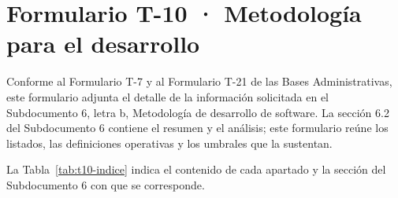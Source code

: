 \documentclass[11pt]{article}
\begin{document}
\hypersetup{pageanchor=false}
\hypersetup{pageanchor=true}
\tableofcontents
\clearpage

\renewcommand{\tablename}{Tabla}
\renewcommand{\thetable}{T-10.\arabic{table}}

\section{Formulario T-10 · Metodología para el desarrollo}\label{formulario-t-10}

Conforme al Formulario T-7 y al Formulario T-21 de las Bases Administrativas, este formulario adjunta el detalle de la información solicitada en el Subdocumento 6, letra b, Metodología de desarrollo de software. La sección 6.2 del Subdocumento 6 contiene el resumen y el análisis; este formulario reúne los listados, las definiciones operativas y los umbrales que la sustentan.

La Tabla~\mbox{\ref{tab:t10-indice}} indica el contenido de cada apartado y la sección del Subdocumento 6 con que se corresponde.
\end{document}
